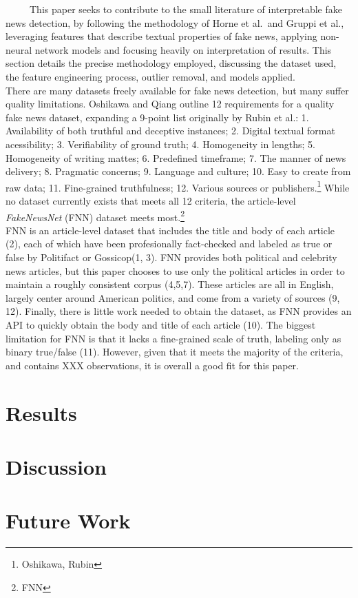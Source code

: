 \documentclass[12pt]{article}
\begin{document}
~~~~~This paper seeks to contribute to the small literature of
interpretable fake news detection, by following the methodology of Horne
et al.~and Gruppi et al., leveraging features that describe textual
properties of fake news, applying non-neural network models and focusing
heavily on interpretation of results. This section details the precise
methodology employed, discussing the dataset used, the feature
engineering process, outlier removal, and models applied.\\
\hspace*{0.333em}\hspace*{0.333em}\hspace*{0.333em}\hspace*{0.333em}\hspace*{0.333em}There
are many datasets freely available for fake news detection, but many
suffer quality limitations. Oshikawa and Qiang outline 12 requirements
for a quality fake news dataset, expanding a 9-point list originally by
Rubin et al.: 1. Availability of both truthful and deceptive instances;
2. Digital textual format acessibility; 3. Verifiability of ground
truth; 4. Homogeneity in lengths; 5. Homogeneity of writing mattes; 6.
Predefined timeframe; 7. The manner of news delivery; 8. Pragmatic
concerns; 9. Language and culture; 10. Easy to create from raw data; 11.
Fine-grained truthfulness; 12. Various sources or publishers.\footnote{Oshikawa,
  Rubin} While no dataset currently exists that meets all 12 criteria,
the article-level \emph{FakeNewsNet} (FNN) dataset meets most.\footnote{FNN}\\
\hspace*{0.333em}\hspace*{0.333em}\hspace*{0.333em}\hspace*{0.333em}\hspace*{0.333em}FNN
is an article-level dataset that includes the title and body of each
article (2), each of which have been profesionally fact-checked and
labeled as true or false by Politifact or Gossicop(1, 3). FNN provides
both political and celebrity news articles, but this paper chooses to
use only the political articles in order to maintain a roughly
consistent corpus (4,5,7). These articles are all in English, largely
center around American politics, and come from a variety of sources (9,
12). Finally, there is little work needed to obtain the dataset, as FNN
provides an API to quickly obtain the body and title of each article
(10). The biggest limitation for FNN is that it lacks a fine-grained
scale of truth, labeling only as binary true/false (11). However, given
that it meets the majority of the criteria, and contains XXX
observations, it is overall a good fit for this paper.

\section{Results}

\section{Discussion}

\section{Future Work}



\end{document}
